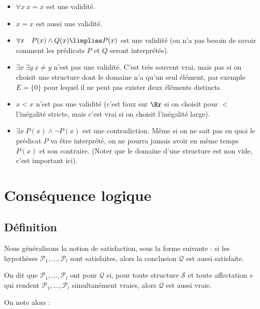 \documentclass[11pt,class=report,crop=false]{standalone}
\begin{document}
\begin{exemple}
	\sauteligne
	\begin{itemize}
		\item \og$\forall x \ x=x$\fg{} est une validité.
		
		\item \og$x=x$\fg{} est aussi une validité.
		
		\item \og$\forall x \quad P(x) \land Q(x) \limplies P(x)$\fg{} est une validité (on n'a pas besoin de savoir comment les prédicats $P$ et $Q$ seront interprétés).
		
		\item \og$\exists x \ \exists y \ x \neq y$\fg{} n'est pas une validité. C'est très souvent vrai, mais pas si on choisit une structure dont le domaine n'a qu'un seul élément, par exemple $E = \{ 0 \}$ pour lequel il ne peut pas exister deux éléments distincts.
		
		\item \og$x < x$\fg{} n'est pas une validité (c'est faux sur $\Rr$ si on choisit pour \og$<$\fg{} l'inégalité stricte, mais c'est vrai si on choisit l'inégalité large).
			
		\item \og$\exists x \  P(x) \land \lnot P(x)$\fg{} est une contradiction. Même si on ne sait pas en quoi le prédicat $P$ va être interprété, on ne pourra jamais avoir en même temps $P(x)$ et son contraire. (Noter que le domaine d'une structure est non vide, c'est important ici).
	\end{itemize}
\end{exemple}



\section{Conséquence logique}

\subsection{Définition}

Nous généralisons la notion de satisfaction, sous la forme suivante : si les hypothèses $\mathcal{P}_1, \ldots, \mathcal{P}_l$ sont satisfaites, alors la conclusion $\mathcal{Q}$ est aussi satisfaite.

\begin{definition}
	On dit que $\mathcal{P}_1, \ldots, \mathcal{P}_l$ ont pour  $\mathcal{Q}$ si, pour toute structure $\mathcal{S}$ et toute affectation $s$ qui rendent $\mathcal{P}_1, \ldots, \mathcal{P}_l$ simultanément vraies, alors $\mathcal{Q}$ est aussi vraie.
	
On note alors :
\end{definition}
\end{document}

